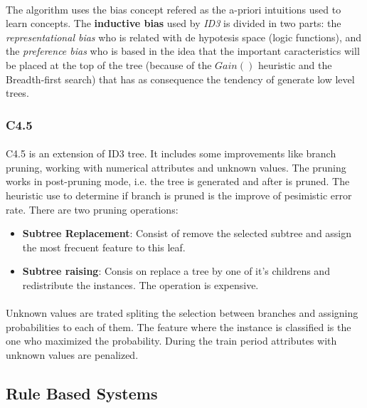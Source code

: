 \documentclass{article}
\begin{document}
				\paragraph{}
				The algorithm uses the bias concept refered as the a-priori intuitions used to learn concepts. The \textbf{inductive bias} used by \emph{ID3} is divided in two parts: the \emph{representational bias} who is related with de hypotesis space (logic functions), and the \emph{preference bias} who is based in the idea that the important caracteristics will be placed at the top of the tree (because of the $Gain()$ heuristic and the Breadth-first search) that has as consequence the tendency of generate low level trees.

			\subsubsection{C4.5}
			\label{sec:c45-trees}

				\paragraph{}
				C4.5 is an extension of ID3 tree. It includes some improvements like branch pruning, working with numerical attributes and unknown values. The pruning works in post-pruning mode, i.e. the tree is generated and after is pruned. The heuristic use to determine if branch is pruned is the improve of pesimistic error rate. There are two pruning operations:

				\begin{itemize}
					\item \textbf{Subtree Replacement}: Consist of remove the selected subtree and assign the most frecuent feature to this leaf.
					\item \textbf{Subtree raising}: Consis on replace a tree by one of it's childrens and redistribute the instances. The operation is expensive.
				\end{itemize}

				\paragraph{}
				Unknown values are trated spliting the selection between branches and assigning probabilities to each of them. The feature where the instance is classified is the one who maximized the probability. During the train period attributes with unknown values are penalized.

		\subsection{Rule Based Systems}
		\label{sec:decision-trees}
\end{document}
